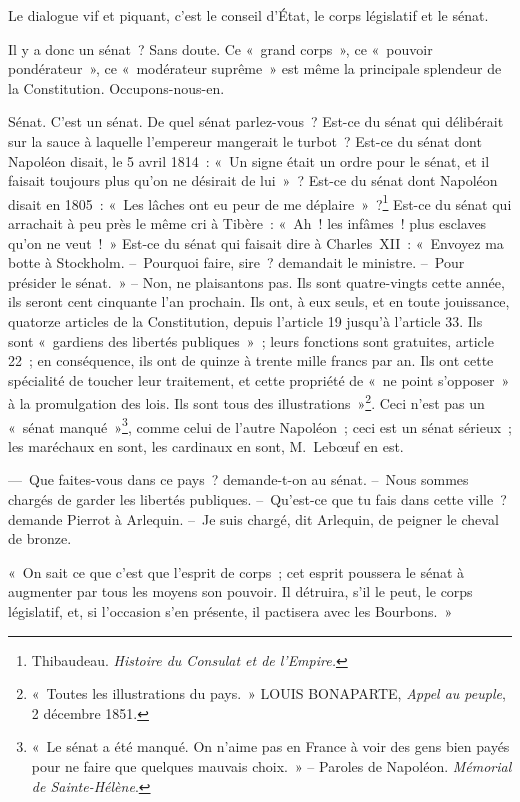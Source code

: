 \documentclass[french,twoside]{book} %
\newenvironment{quoteblock}%
  {\begin{quoting}}
  {\end{quoting}}
\newenvironment{quotebar}{%
    \def\FrameCommand{{\color{rubric!10!}\vrule width 0.5em} \hspace{0.9em}}%
    \def\OuterFrameSep{0pt} %
    \MakeFramed {\advance\hsize-\width \FrameRestore}
  }%
  {%
    \endMakeFramed
  }
\renewenvironment{quoteblock}%
  {%
    \savenotes
    \setstretch{0.9}
    \begin{quotebar}
    \smallskip
  }
  {%
    \smallskip
    \end{quotebar}
    \spewnotes
  }
\begin{document}
\noindent Le dialogue vif et piquant, c’est le conseil d’État, le corps législatif et le sénat.\par
Il y a donc un sénat ? Sans doute. Ce « grand corps », ce « pouvoir pondérateur », ce « modérateur suprême » est même la principale splendeur de la Constitution. Occupons-nous-en.\par
Sénat. C’est un sénat. De quel sénat parlez-vous ? Est-ce du sénat qui délibérait sur la sauce à laquelle l’empereur mangerait le turbot ? Est-ce du sénat dont Napoléon disait, le 5 avril 1814 : « Un signe était un ordre pour le sénat, et il faisait toujours plus qu’on ne désirait de lui » ? Est-ce du sénat dont Napoléon disait en 1805 : « Les lâches ont eu peur de me déplaire » ?\footnote{Thibaudeau. \emph{Histoire du Consulat et de l’Empire.}} Est-ce du sénat qui arrachait à peu près le même cri à Tibère : « Ah ! les infâmes ! plus esclaves qu’on ne veut ! » Est-ce du sénat qui faisait dire à Charles XII : « Envoyez ma botte à Stockholm. – Pourquoi faire, sire ? demandait le ministre. – Pour présider le sénat. » – Non, ne plaisantons pas. Ils sont quatre-vingts cette année, ils seront cent cinquante l’an prochain. Ils ont, à eux seuls, et en toute jouissance, quatorze articles de la Constitution, depuis l’article 19 jusqu’à l’article 33. Ils sont « gardiens des libertés publiques » ; leurs fonctions sont gratuites, article 22 ; en conséquence, ils ont de quinze à trente mille francs par an. Ils ont cette spécialité de toucher leur traitement, et cette propriété de « ne point s’opposer » à la promulgation des lois. Ils sont tous des illustrations »\footnote{« Toutes les illustrations du pays. » LOUIS BONAPARTE, \emph{Appel au peuple}, 2 décembre 1851.}. Ceci n’est pas un « sénat manqué »\footnote{« Le sénat a été manqué. On n’aime pas en France à voir des gens bien payés pour ne faire que quelques mauvais choix. » – Paroles de Napoléon. \emph{Mémorial de Sainte-Hélène}.}, comme celui de l’autre Napoléon ; ceci est un sénat sérieux ; les maréchaux en sont, les cardinaux en sont, M. Lebœuf en est.\par
— Que faites-vous dans ce pays ? demande-t-on au sénat. – Nous sommes chargés de garder les libertés publiques. – Qu’est-ce que tu fais dans cette ville ? demande Pierrot à Arlequin. – Je suis chargé, dit Arlequin, de peigner le cheval de bronze.\par

\begin{quoteblock}
 \noindent « On sait ce que c’est que l’esprit de corps ; cet esprit poussera le sénat à augmenter par tous les moyens son pouvoir. Il détruira, s’il le peut, le corps législatif, et, si l’occasion s’en présente, il pactisera avec les Bourbons. »
 \end{quoteblock}
\end{document}
